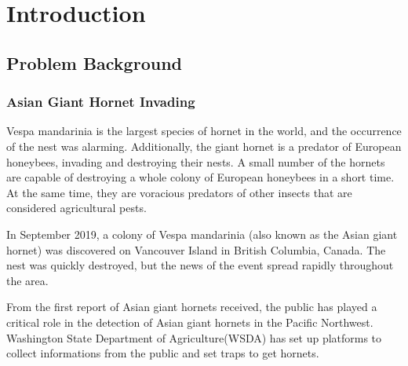 \documentclass[12pt]{article}
\begin{document}
\clearpage
\pagestyle{fancy}
\tableofcontents 
\newpage
\setcounter{page}{1}






\section{Introduction}
\subsection{Problem Background}
\subsubsection{Asian Giant Hornet Invading  }
Vespa mandarinia is the largest species of hornet in the world, and the occurrence of the nest was alarming. Additionally, the giant hornet is a predator of European honeybees, invading and destroying their nests. A small number of the hornets are capable of destroying a whole colony of European honeybees in a short time. At the same time, they are voracious predators of other insects that are considered agricultural pests.

In September 2019, a colony of Vespa mandarinia (also known as the Asian giant hornet) was discovered on Vancouver Island in British Columbia, Canada. The nest was quickly destroyed, but the news of the event spread rapidly throughout the area. 

From the first report of Asian giant hornets received, the public has played a critical role in the detection of Asian giant hornets in the Pacific Northwest. Washington State Department of Agriculture(WSDA)  has set up platforms\cite{fb} to collect informations from the  public and set traps to get hornets.  
 
\end{document}
